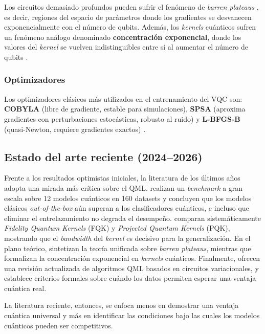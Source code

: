 \documentclass[a4paper,10pt,twocolumn]{article}
\begin{document}
Los circuitos demasiado profundos pueden sufrir el
fen\'omeno de \emph{barren plateaus} \citep{mcclean2018, larocca2025},
es decir, regiones del espacio de par\'ametros donde los gradientes se
desvanecen exponencialmente con el n\'umero de qubits. Adem\'as, los
\textit{kernels} cu\'anticos sufren un fen\'omeno an\'alogo denominado
\textbf{concentraci\'on exponencial}, donde los valores del
\textit{kernel} se vuelven indistinguibles entre s\'i al aumentar el
n\'umero de qubits \citep{thanasilp2024}.

\subsubsection{Optimizadores}
Los optimizadores cl\'asicos m\'as utilizados en el entrenamiento del
VQC son: \textbf{COBYLA} (libre de gradiente, estable para
simulaciones), \textbf{SPSA} (aproxima gradientes con perturbaciones
estoc\'asticas, robusto al ruido) y \textbf{L-BFGS-B} (quasi-Newton,
requiere gradientes exactos) \citep{cerezo2021}.

\subsection{Estado del arte reciente (2024--2026)}

Frente a los resultados optimistas iniciales, la literatura
de los \'ultimos a\~nos adopta una mirada m\'as cr\'itica sobre el
QML. \citet{bowles2024} realizan un \textit{benchmark} a gran escala
sobre 12 modelos cu\'anticos en 160 datasets y concluyen que los
modelos cl\'asicos \emph{out-of-the-box} a\'un superan a los
clasificadores cu\'anticos, e incluso que eliminar el entrelazamiento
no degrada el desempe\~no. \citet{schnabel2024} comparan
sistem\'aticamente \textit{Fidelity Quantum Kernels} (FQK) y
\textit{Projected Quantum Kernels} (PQK), mostrando que el
\textit{bandwidth} del \textit{kernel} es decisivo para la
generalizaci\'on. En el plano te\'orico, \citet{larocca2025} sintetizan
la teor\'ia unificada sobre \textit{barren plateaus}, mientras que
\citet{thanasilp2024} formalizan la concentraci\'on exponencial en
\textit{kernels} cu\'anticos. Finalmente, \citet{yu2025} ofrecen una
revisi\'on actualizada de algoritmos QML basados en circuitos
variacionales, y \citet{huang2021} establece criterios formales sobre
cu\'ando los datos permiten esperar una ventaja cu\'antica real.

\noindent La literatura reciente, entonces, se enfoca menos en demostrar
una ventaja cu\'antica universal y m\'as en identificar las condiciones
bajo las cuales los modelos cu\'anticos pueden ser competitivos.
\end{document}
